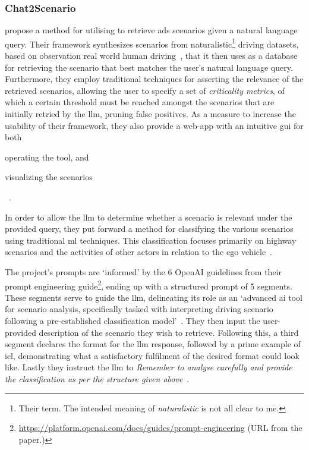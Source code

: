 \subsubsection{Chat2Scenario}

\citeauthor{chat2Scenario} propose a method for utilising  to retrieve
\acrshort{ads} scenarios given a natural language query. Their framework synthesizes scenarios from
naturalistic\footnote{Their term. The intended meaning of \textit{naturalistic} is not all clear to
    me.} driving datasets, based on observation real world human driving~\cite[55]{chat2Scenario}, that
it then uses as a database for retrieving the scenario that best matches the user's natural
language query. Furthermore, they employ traditional techniques for asserting the relevance of the
retrieved scenarios, allowing the user to specify a set of \textit{criticality metrics}, of which a
certain threshold must be reached amongst the scenarios that are initially retried by the
\acrshort{llm}, pruning false positives. As a measure to increase the usability of their framework,
they also provide a web-app with an intuitive \acrshort{gui} for both \begin{inparaenum}
    \item operating the tool, and
    \item visualizing the scenarios \end{inparaenum}~\cite[560]{chat2Scenario}.

In order to allow the \acrshort{llm} to determine whether a scenario is relevant under the
provided query, they put forward a method for classifying the various scenarios using traditional
\acrshort{ml} techniques. This classification focuses primarily on highway scenarios and the
activities of other actors in relation to the ego vehicle~\cite[561-562]{chat2Scenario}.



The project's prompts are `informed' by the \num{6} OpenAI guidelines from their prompt
engineering guide\footnote{\url{https://platform.openai.com/docs/guides/prompt-engineering} (URL
    from the paper.)}, ending up with a structured prompt of \num{5} segments. These segments serve to
guide the \acrshort{llm}, delineating its role as an `advanced \acrshort{ai} tool for scenario
analysis, specifically tasked with interpreting driving scenario following a pre-established
classification model'~\cite[562]{chat2Scenario}. They then input the user-provided description of
the scenario they wish to retrieve. Following this, a third segment declares the format for the
\acrshort{llm} response, followed by a prime example of \acrlong{icl}, demonstrating what a
satisfactory fulfilment of the desired format could look like. Lastly they instruct the
\acrshort{llm} to \textit{Remember to analyse carefully and provide the classification as per the
    structure given above}~\cite[563]{chat2Scenario}.

